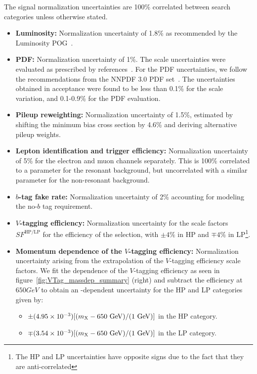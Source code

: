 The signal normalization uncertainties are 100\% correlated between search categories unless otherwise stated.
\begin{itemize}
  \item {\bfseries Luminosity:} Normalization uncertainty of 1.8\% as recommended by the Luminosity POG~\cite{LumiPOG}.
  \item {\bfseries PDF:} Normalization uncertainty of 1\%.
  The scale uncertainties were evaluated as prescribed by references~\cite{Cacciari_2004,Catani_2003}.
  For the PDF uncertainties, we follow the recommendations from the NNPDF 3.0 PDF set~\cite{Ball2011296}.
  The uncertainties obtained in acceptance were found to be less than 0.1\% for the scale variation, and 0.1-0.9\% for the PDF evaluation.
  \item {\bfseries Pileup reweighting:} Normalization uncertainty of 1.5\%, estimated by shifting the minimum bias cross section by 4.6\% and deriving alternative pileup weights.
  \item {\bfseries Lepton identification and trigger efficiency:} Normalization uncertainty of 5\% for the electron and muon channels separately.
  This is 100\% correlated to a parameter for the resonant background, but uncorrelated with a similar parameter for the non-resonant background.
  \item {\bfseries $b$-tag fake rate:} Normalization uncertainty of 2\% accounting for modeling the no-$b$ tag requirement.
  \item {\bfseries $V$-tagging efficiency:} Normalization uncertainty for the scale factors $SF^{\mathrm{HP}/\mathrm{LP}}$ for the efficiency of the \nsubjDDT selection, with $\pm4\%$ in HP and $\mp4\%$ in LP\footnote{The HP and LP uncertainties have opposite signs due to the fact that they are anti-correlated}.
  \item {\bfseries Momentum dependence of the $V$-tagging efficiency:} Normalization uncertainty arising from the extrapolation of the $V$-tagging efficiency scale factors.
  We fit the \MX dependence of the $V$-tagging efficiency as seen in figure~\ref{fig:VTag_massdep_summary} (right) and subtract the efficiency at $650\unit{GeV}$ to obtain an \MX-dependent uncertainty for the HP and LP categories given by:
  \begin{itemize}
    \item $\pm(4.95\times10^{-3})[(\MX-650\unit{GeV})/(1\unit{GeV})]$ in the HP category.
    \item $\mp(3.54\times10^{-3})[(\MX-650\unit{GeV})/(1\unit{GeV})]$ in the LP category.

\end{itemize}
\end{itemize}
